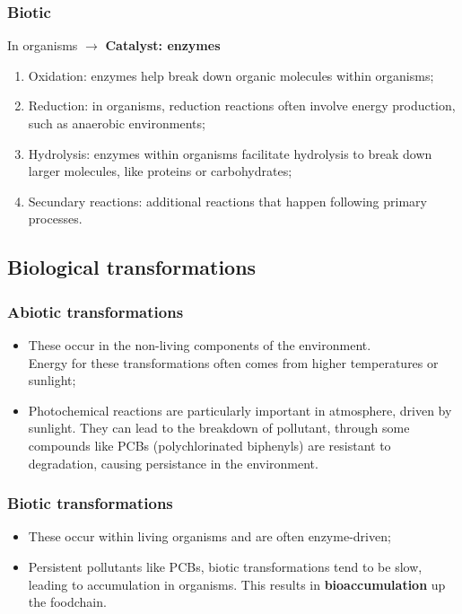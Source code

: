 \documentclass{article}
\begin{document}
\subsubsection{Biotic}
In organisms $\rightarrow$ \textbf{Catalyst: enzymes}
\begin{enumerate}
    \item Oxidation: enzymes help break down organic molecules within organisms;
    \item Reduction: in organisms, reduction reactions often involve energy production, such as anaerobic environments;
    \item Hydrolysis: enzymes within organisms facilitate hydrolysis to break down larger molecules, like proteins or carbohydrates;
    \item Secundary reactions: additional reactions that happen following primary processes.
\end{enumerate}

\subsection{Biological transformations}
\subsubsection{Abiotic transformations}
\begin{itemize}
    \item These occur in the non-living components of the environment.\\
        Energy for these transformations often comes from higher
        temperatures or sunlight;
    \item Photochemical reactions are particularly important in
        atmosphere, driven by sunlight. They can lead to the breakdown
        of pollutant, through some compounds like PCBs (polychlorinated biphenyls)
        are resistant to degradation, causing persistance in the environment.
\end{itemize}

\subsubsection{Biotic transformations}
\begin{itemize}
    \item These occur within living organisms and are often enzyme-driven;
    \item Persistent pollutants like PCBs, biotic transformations tend
        to be slow, leading to accumulation in organisms. This results
        in \textbf{bioaccumulation} up the foodchain.
\end{itemize}
\end{document}

